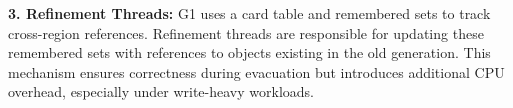\textbf{3. Refinement Threads:}  
G1 uses a card table and remembered sets to track cross-region references. Refinement threads 
are responsible for updating these remembered sets with references to objects existing in the old generation. 
This mechanism ensures correctness during evacuation but introduces additional CPU overhead, especially under write-heavy workloads.



